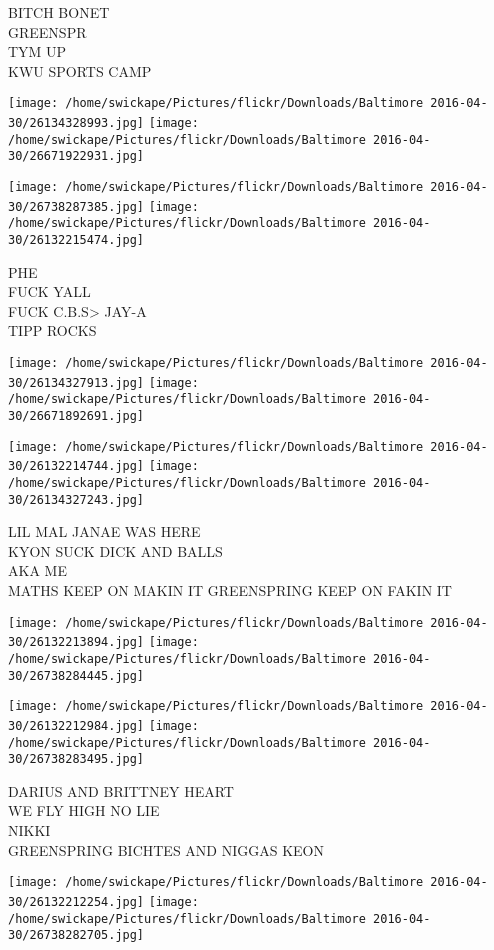 \documentclass[10pt,letterpaper]{article}
\begin{document}
BITCH BONET\\
GREENSPR\\
TYM UP\\
KWU SPORTS CAMP
\pagebreak

\texttt{[image: /home/swickape/Pictures/flickr/Downloads/Baltimore 2016-04-30/26134328993.jpg]}
\texttt{[image: /home/swickape/Pictures/flickr/Downloads/Baltimore 2016-04-30/26671922931.jpg]}

\texttt{[image: /home/swickape/Pictures/flickr/Downloads/Baltimore 2016-04-30/26738287385.jpg]}
\texttt{[image: /home/swickape/Pictures/flickr/Downloads/Baltimore 2016-04-30/26132215474.jpg]}

PHE\\
FUCK YALL\\
FUCK C.B.S> JAY{-}A\\
TIPP ROCKS
\pagebreak

\texttt{[image: /home/swickape/Pictures/flickr/Downloads/Baltimore 2016-04-30/26134327913.jpg]}
\texttt{[image: /home/swickape/Pictures/flickr/Downloads/Baltimore 2016-04-30/26671892691.jpg]}

\texttt{[image: /home/swickape/Pictures/flickr/Downloads/Baltimore 2016-04-30/26132214744.jpg]}
\texttt{[image: /home/swickape/Pictures/flickr/Downloads/Baltimore 2016-04-30/26134327243.jpg]}

LIL MAL JANAE WAS HERE\\
KYON SUCK DICK AND BALLS\\
AKA ME\\
MATHS KEEP ON MAKIN IT GREENSPRING KEEP ON FAKIN IT
\pagebreak

\texttt{[image: /home/swickape/Pictures/flickr/Downloads/Baltimore 2016-04-30/26132213894.jpg]}
\texttt{[image: /home/swickape/Pictures/flickr/Downloads/Baltimore 2016-04-30/26738284445.jpg]}

\texttt{[image: /home/swickape/Pictures/flickr/Downloads/Baltimore 2016-04-30/26132212984.jpg]}
\texttt{[image: /home/swickape/Pictures/flickr/Downloads/Baltimore 2016-04-30/26738283495.jpg]}

DARIUS AND BRITTNEY HEART\\
WE FLY HIGH NO LIE\\
NIKKI\\
GREENSPRING BICHTES AND NIGGAS KEON
\pagebreak

\texttt{[image: /home/swickape/Pictures/flickr/Downloads/Baltimore 2016-04-30/26132212254.jpg]}
\texttt{[image: /home/swickape/Pictures/flickr/Downloads/Baltimore 2016-04-30/26738282705.jpg]}
\end{document}
